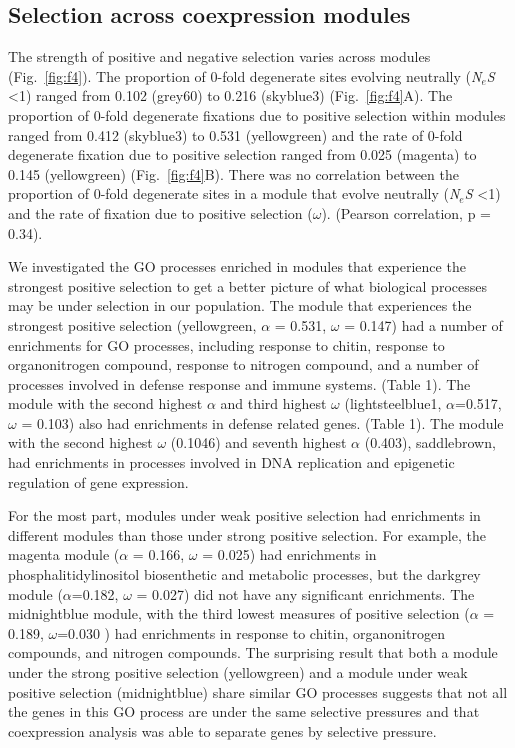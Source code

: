 \subsection{Selection across coexpression modules}
The strength of positive and negative selection varies across modules (Fig.~\ref{fig:f4}). The proportion of 0-fold degenerate sites evolving neutrally (\textit{N$_{e}$S} \textless 1) ranged from 0.102 (grey60) to 0.216 (skyblue3) (Fig.~\ref{fig:f4}A). The proportion of 0-fold degenerate fixations due to positive selection within modules ranged from  0.412 (skyblue3) to 0.531 (yellowgreen) and the rate of 0-fold degenerate fixation due to positive selection ranged from 0.025 (magenta) to 0.145 (yellowgreen) (Fig.~\ref{fig:f4}B). There was no correlation between the proportion of 0-fold degenerate sites in a module that evolve neutrally (\textit{N$_{e}$S} \textless 1) and the rate of fixation due to positive selection ($\omega$). (Pearson correlation, p = 0.34). 

We investigated the GO processes enriched in modules that experience the strongest positive selection to get a better picture of what biological processes may be under selection in our population. The module that experiences the strongest positive selection (yellowgreen, $\alpha$ = 0.531, $\omega$ = 0.147) had a number of enrichments for GO processes, including response to chitin, response to organonitrogen compound, response to nitrogen compound, and a number of processes involved in defense response and immune systems. (Table 1). The module with the second highest $\alpha$ and third highest $\omega$ (lightsteelblue1, $\alpha$=0.517, $\omega$ = 0.103) also had enrichments in defense related genes. (Table 1).  The module with the second highest $\omega$ (0.1046) and seventh highest $\alpha$ (0.403), saddlebrown, had enrichments in processes involved in DNA replication and epigenetic regulation of gene expression.

For the most part, modules under weak positive selection had enrichments in different modules than those under strong positive selection. For example, the magenta module ($\alpha$ = 0.166, $\omega$ = 0.025) had enrichments in phosphalitidylinositol biosenthetic and metabolic processes, but the darkgrey module ($\alpha$=0.182, $\omega$ = 0.027) did not have any significant enrichments. The midnightblue module, with the third lowest measures of positive selection ($\alpha$ = 0.189, $\omega$=0.030 ) had enrichments in response to chitin, organonitrogen compounds, and nitrogen compounds. The surprising result that both a module under the strong positive selection (yellowgreen) and a module under weak positive selection (midnightblue) share similar GO processes suggests that not all the genes in this GO process are under the same selective pressures and that coexpression analysis was able to separate genes by selective pressure.


